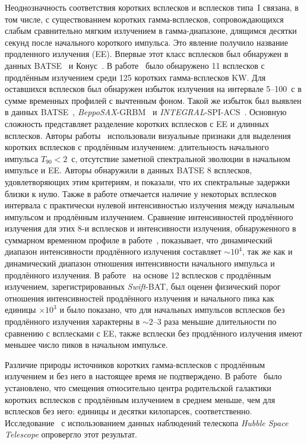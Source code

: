 Неоднозначность соответствия коротких всплесков и всплесков типа~I связана, в том числе, с 
существованием коротких гамма-всплесков, сопровождающихся слабым сравнительно мягким 
излучением в гамма-диапазоне, длящимся десятки секунд после начального короткого импульса. 
Это явление получило название продленного излучения (EE).
Впервые этот класс всплесков был обнаружен в данных BATSE~\citep{Burenin_2000AstL} и 
Конус~\citep{Mazets_2002astro_ph}. В работе~\cite{Frederiks_2004ASPC} 
было обнаружено 11 всплесков с продлённым излучением среди 125 коротких гамма-всплесков KW. 
Для оставшихся всплесков был обнаружен избыток излучения на интервале 5--100~с в сумме временных 
профилей с вычтенным фоном. Такой же избыток был выявлен в данных 
BATSE~\citep{Lazzati_2001AandA, Connaughton_2002ApJ}, \textit{BeppoSAX}-GRBM~\citep{Montanari_2005ApJ} и 
\textit{INTEGRAL}-SPI-ACS~\citep{Minaev_2010AstL}. 
Основную сложность представляет разделение коротких всплесков с EE 
и длинных всплесков. Авторы работы~\citep{Norris_and_Bonnel_2006ApJ} использовали визуальные признаки 
для выделения коротких всплесков с продлённым излучением: длительность начального 
импульса $T_{90}<2$~с, отсутствие заметной спектральной эволюции в начальном 
импульсе и EE. Авторы обнаружили в данных BATSE 8 всплесков, 
удовлетворяющих этим критериям, и показали, что их спектральные задержки близки к нулю. 
Также в работе отмечается наличие у некоторых всплесков интервала с практически нулевой интенсивностью излучения 
между начальным импульсом и продлённым излучением. Сравнение интенсивностей продлённого 
излучения для этих 8-и всплесков и интенсивности излучения, обнаруженного в 
суммарном временном профиле в работе~\citep{Lazzati_2001AandA}, показывает, 
что динамический диапазон интенсивности продлённого излучения составляет $\sim 10^4$, 
так же как и динамический диапазон отношения интенсивности начального импульса и продлённого излучения.
В работе~\citep{Norris_2010ApJ} на основе 12 всплесков с продлённым излучением, зарегистрированных 
\textit{Swift}-BAT, был оценен физический порог отношения интенсивностей продлённого излучения 
и начального пика как единицы $\times 10^3$ и было показано, что для начальных импульсов 
всплесков без продлённого излучения характерны в $\sim 2\textrm{--}3$ раза меньшие длительности
 по сравнению с всплесками с EE, также всплески без продлённого излучения 
имеют меньшее число пиков в начальном импульсе.

Различие природы источников коротких гамма-всплесков с продлённым излучением и 
без него в настоящее время не подтверждено. В работе~\citep{Troja_2008MNRAS} 
было установлено, что смещения относительно центра родительской галактики 
коротких всплесков с продлённым излучением в среднем меньше, чем для всплесков без него: 
единицы и десятки килопарсек, соответственно. 
Исследование~\citep{Fong_2010ApJ} с использованием данных наблюдений 
телескопа \textit{Hubble Space Telescope} опровергло этот результат.

